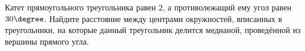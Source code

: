\begin{ex}
	\begin{condition}
		Катет прямоугольного треугольника равен \( 2 \), а противолежащий ему угол равен \( 30\degree \). Найдите расстояние между центрами окружностей, вписанных в треугольники, на которые данный треугольник	делится медианой, проведённой из вершины прямого угла.
	\end{condition}
\end{ex}
